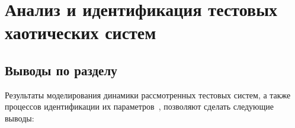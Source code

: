 \chapter{Анализ и идентификация тестовых хаотических систем }
\label{atu:ch:testsys}















\section{Выводы по разделу \thechapter}  %

Результаты моделирования динамики рассмотренных тестовых систем,
а также процессов идентификации их параметров~\cite{atu_colmono2016},
позволяют сделать следующие выводы:

